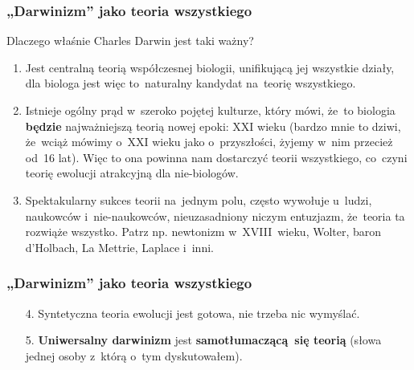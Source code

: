\documentclass[10pt,t]{beamer}
\begin{document}
\begin{frame}
  \frametitle{„Darwinizm” jako teoria wszystkiego}


  Dlaczego właśnie Charles Darwin jest taki ważny?

  \begin{enumerate}
    \RaggedRight

  \item Jest centralną teorią współczesnej biologii, unifikującą jej
    wszystkie działy, dla biologa jest więc to~naturalny kandydat na~teorię
    wszystkiego.

  \item Istnieje ogólny prąd w~szeroko pojętej kulturze, który mówi,
    że~to biologia \textbf{będzie} najważniejszą teorią nowej epoki: XXI
    wieku (bardzo mnie to dziwi, że~wciąż mówimy o~XXI wieku jako
    o~przyszłości, żyjemy w~nim przecież od~16 lat). Więc to ona
    powinna nam dostarczyć teorii wszystkiego, co~czyni teorię
    ewolucji atrakcyjną dla nie-biologów.

  \item Spektakularny sukces teorii na~jednym polu, często wywołuje
    u~ludzi, naukowców i~nie-naukowców, nieuzasadniony niczym
    entuzjazm, że~teoria ta rozwiąże wszystko. Patrz np. newtonizm
    w~XVIII~wieku, Wolter, baron d'Holbach, La Mettrie, Laplace
    i~inni.

  \end{enumerate}

\end{frame}





\begin{frame}
  \frametitle{„Darwinizm” jako teoria wszystkiego}


  \begin{enumerate}
    \RaggedRight

  \item[4.] Syntetyczna teoria ewolucji jest gotowa, nie trzeba nic
    wymyślać.

  \item[5.] \textbf{Uniwersalny darwinizm} jest \textbf{samotłumaczącą~się
      teorią} (słowa jednej osoby z~którą o~tym dyskutowałem).

  \end{enumerate}

\end{frame}
\end{document}
